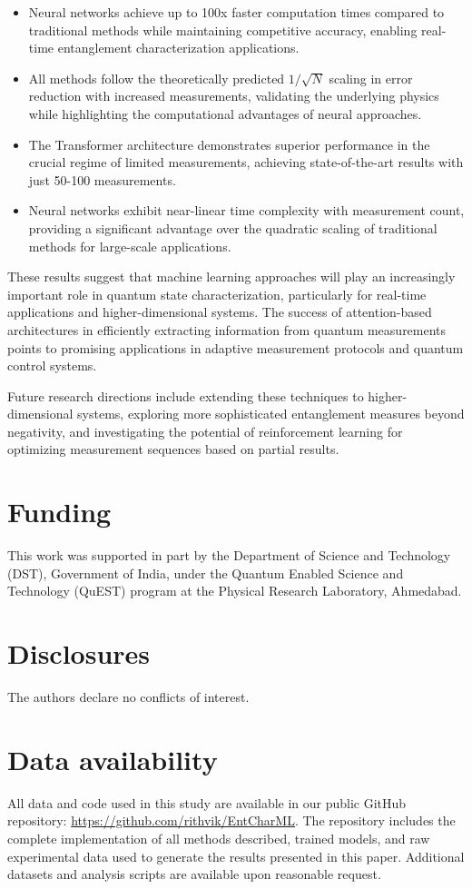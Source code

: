 \documentclass{optica-article}
\begin{document}
\begin{itemize}
\item Neural networks achieve up to 100x faster computation times compared to traditional methods while maintaining competitive accuracy, enabling real-time entanglement characterization applications.

\item All methods follow the theoretically predicted $1/\sqrt{N}$ scaling in error reduction with increased measurements, validating the underlying physics while highlighting the computational advantages of neural approaches.

\item The Transformer architecture demonstrates superior performance in the crucial regime of limited measurements, achieving state-of-the-art results with just 50-100 measurements.

\item Neural networks exhibit near-linear time complexity with measurement count, providing a significant advantage over the quadratic scaling of traditional methods for large-scale applications.
\end{itemize}

These results suggest that machine learning approaches will play an increasingly important role in quantum state characterization, particularly for real-time applications and higher-dimensional systems. The success of attention-based architectures in efficiently extracting information from quantum measurements points to promising applications in adaptive measurement protocols and quantum control systems.

Future research directions include extending these techniques to higher-dimensional systems, exploring more sophisticated entanglement measures beyond negativity, and investigating the potential of reinforcement learning for optimizing measurement sequences based on partial results.

\section*{Funding}
This work was supported in part by the Department of Science and Technology (DST), Government of India, under the Quantum Enabled Science and Technology (QuEST) program at the Physical Research Laboratory, Ahmedabad.

\section*{Disclosures}
The authors declare no conflicts of interest.

\section*{Data availability}
All data and code used in this study are available in our public GitHub repository: \url{https://github.com/rithvik/EntCharML}. The repository includes the complete implementation of all methods described, trained models, and raw experimental data used to generate the results presented in this paper. Additional datasets and analysis scripts are available upon reasonable request.


\end{document}

